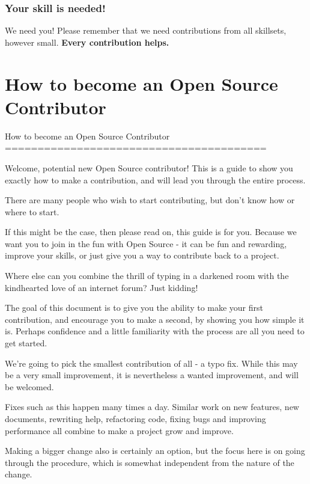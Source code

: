 \documentclass[t,handout]{beamer}
\begin{document}
\begin{frame}[fragile]\frametitle{Your skill is needed!}
    \vfill
    \begin{alertblock}{We need you!}
        Please remember that we need contributions from all skillsets, however small. \textbf{Every contribution helps.}
    \end{alertblock}
    \vfill
\end{frame}

\section{How to become an Open Source Contributor}

\iffalse
How to become an Open Source Contributor
========================================

Welcome, potential new Open Source contributor! This is a guide
to show you exactly how to make a contribution, and will lead you
through the entire process.

There are many people who wish to start contributing, but don't
know how or where to start.

If this might be the case, then please read on, this guide is for
you. Because we want you to join in the fun with Open Source - it
can be fun and rewarding, improve your skills, or just give you a
way to contribute back to a project.

Where else can you combine the thrill of typing in a darkened
room with the kindhearted love of an internet forum?  Just kidding!

The goal of this document is to give you the ability to make your
first contribution, and encourage you to make a second, by showing
you how simple it is. Perhaps confidence and a little familiarity
with the process are all you need to get started.

We're going to pick the smallest contribution of all - a typo fix.
While this may be a very small improvement, it is nevertheless a
wanted improvement, and will be welcomed.

Fixes such as this happen many times a day. Similar work on new
features, new documents, rewriting help, refactoring code, fixing
bugs and improving performance all combine to make a project grow
and improve.

Making a bigger change also is certainly an option, but the focus
here is on going through the procedure, which is somewhat
independent from the nature of the change.
\end{document}

